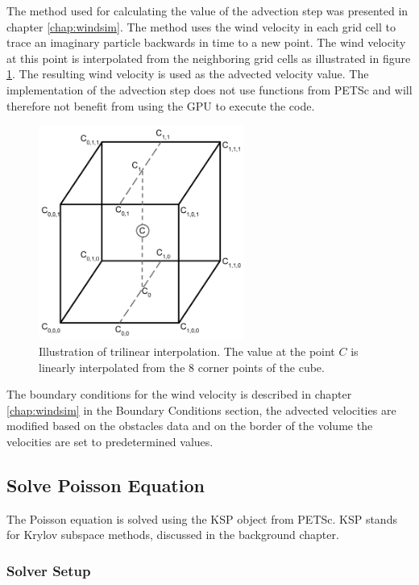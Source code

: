 The method used for calculating the value of the advection step was presented
in chapter \ref{chap:windsim}. The method uses the wind velocity in each grid cell
to trace an imaginary particle backwards in time to a new point. The wind velocity
at this point is interpolated from the neighboring grid cells as illustrated in
figure \ref{fig:trilinearinterpolation}. The resulting wind velocity is used as
the advected velocity value. The implementation of the advection step does not
use functions from PETSc and will therefore not benefit from using the GPU to
execute the code.

\begin{figure}[ht]
	\center
	\includegraphics[width=0.6\textwidth]{images/trilinear_interpolation}
	\caption{Illustration of trilinear interpolation. The value at the point
	$C$ is linearly interpolated from the 8 corner points of the cube.}
	\label{fig:trilinearinterpolation}
\end{figure}

The boundary conditions for the wind velocity is described in chapter \ref{chap:windsim}
in the Boundary Conditions section, the advected velocities are modified based on
the obstacles data and on the border of the volume the velocities are set to
predetermined values.

\subsection{Solve Poisson Equation}

The Poisson equation is solved using the KSP object from PETSc. KSP stands for
Krylov subspace methods, discussed in the background chapter.

\subsubsection{Solver Setup}

